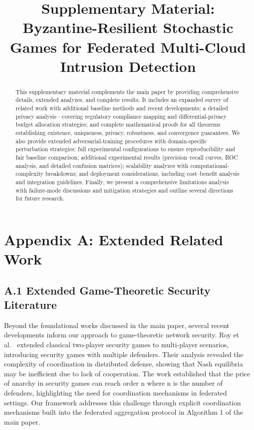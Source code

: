 \documentclass[12pt,a4paper]{article}
\theoremstyle{definition}
\begin{document}
\title{\textbf{Supplementary Material:\\Byzantine-Resilient Stochastic Games for Federated Multi-Cloud Intrusion Detection}}


\date{}
\maketitle

\begin{abstract}
This supplementary material complements the main paper by providing comprehensive details, extended analyzes, and complete results. It includes an expanded survey of related work with additional baseline methods and recent developments; a detailed privacy analysis—covering regulatory compliance mapping and differential-privacy budget allocation strategies; and complete mathematical proofs for all theorems establishing existence, uniqueness, privacy, robustness, and convergence guarantees. We also provide extended adversarial-training procedures with domain-specific perturbation strategies; full experimental configurations to ensure reproducibility and fair baseline comparison; additional experimental results (precision–recall curves, ROC analysis, and detailed confusion matrices); scalability analyzes with computational-complexity breakdowns; and deployment considerations, including cost–benefit analysis and integration guidelines. Finally, we present a comprehensive limitations analysis with failure-mode discussions and mitigation strategies and outline several directions for future research.
\end{abstract}


\tableofcontents
\clearpage

\section{Appendix A: Extended Related Work}

\subsection{A.1 Extended Game-Theoretic Security Literature}

Beyond the foundational works discussed in the main paper, several recent developments inform our approach to game-theoretic network security. Roy et al.~\cite{roy2010survey} extended classical two-player security games to multi-player scenarios, introducing security games with multiple defenders. Their analysis revealed the complexity of coordination in distributed defense, showing that Nash equilibria may be inefficient due to lack of cooperation. The work established that the price of anarchy in security games can reach order n where n is the number of defenders, highlighting the need for coordination mechanisms in federated settings. Our framework addresses this challenge through explicit coordination mechanisms built into the federated aggregation protocol in Algorithm 1 of the main paper.
\end{document}
